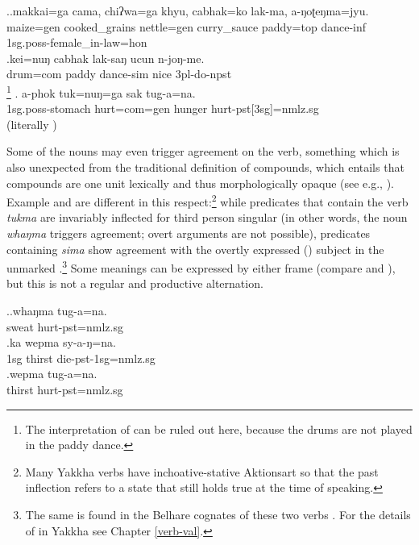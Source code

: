 \ex.\ag.makkai=ga cama, chiʔwa=ga    khyu,   cabhak=ko  lak-ma, a-ŋoʈeŋma=jyu.\\
maize{\sc =gen} cooked\_grains nettle{\sc =gen} curry\_sauce paddy{\sc =top} dance{\sc -inf} {\sc 1sg.poss-}female\_in-law{\sc =hon}\\
 
\bg.kei=nuŋ cabhak lak-saŋ ucun n-joŋ-me.\\
drum{\sc =com} paddy dance{\sc -sim} nice {\sc 3pl-}do{\sc -npst}\\
\footnote{The interpretation of  can be ruled out here, because the drums are not played in the paddy dance.} 
	\bg. a-phok tuk=nuŋ=ga  sak tug-a=na.\\
	{\sc 1sg.poss}-stomach hurt{\sc =com=gen} hunger hurt{\sc -pst[3sg]=nmlz.sg}	\\
	 (literally ) 

	
Some of the nouns may even trigger agreement on the verb, something which is also unexpected from the traditional definition of compounds, which entails that compounds are one unit lexically and thus morphologically opaque  (see e.g., \citealt{Fabb2001Compounding}). Example \Next[a] and \Next[b] are different in this respect:\footnote{Many Yakkha verbs have inchoative-stative Aktionsart so that the past inflection refers to a state that still holds true at the time of speaking.} while predicates that contain the verb \emph{tukma}  are invariably inflected for third person singular (in other words, the noun \emph{whaŋma} triggers agreement; overt arguments are not possible), predicates containing \emph{sima}   show agreement with the overtly expressed () subject in the unmarked  \Next[b].\footnote{The same  is found in the Belhare cognates of these two verbs \citep{Bickel1997The-possessive}. For the details of  in Yakkha see Chapter \ref{verb-val}.} Some meanings can be expressed by either frame (compare \Next[b] and \Next[c]), but this is not a regular and productive alternation.
  
\ex.\ag.whaŋma tug-a=na.\\
sweat hurt{\sc [3sg]-pst=nmlz.sg}\\
\bg.ka wepma sy-a-ŋ=na.\\
{\sc 1sg} thirst die{\sc -pst-1sg=nmlz.sg}\\
\bg.wepma tug-a=na.\\
thirst hurt{\sc [3sg]-pst=nmlz.sg}\\

